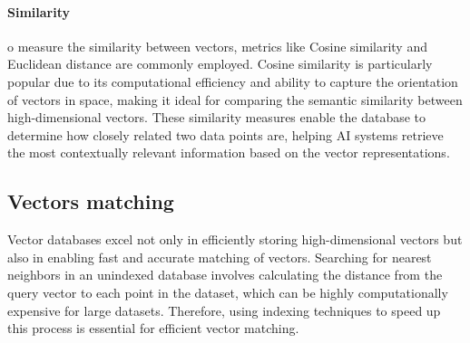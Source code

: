 \paragraph*{Similarity}
o measure the similarity between vectors, metrics like Cosine similarity and Euclidean distance are commonly employed.
Cosine similarity is particularly popular due to its computational efficiency and ability to capture the orientation of vectors in space, making it ideal for comparing the semantic similarity between high-dimensional vectors. 
These similarity measures enable the database to determine how closely related two data points are, helping AI systems retrieve the most contextually relevant information based on the vector representations.

\subsection{Vectors matching}
Vector databases excel not only in efficiently storing high-dimensional vectors but also in enabling fast and accurate matching of vectors. 
Searching for nearest neighbors in an unindexed database involves calculating the distance from the query vector to each point in the dataset, which can be highly computationally expensive for large datasets.
Therefore, using indexing techniques to speed up this process is essential for efficient vector matching.

